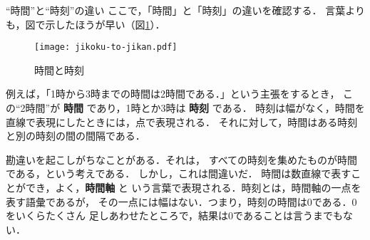             \begin{memo}{“時間”と“時刻”の違い}
                ここで，「時間」と「時刻」の違いを確認する．
                言葉よりも，図で示したほうが早い（図\ref{fig:jikoku-to-jikan}）．
                \begin{figure}[hbt]
                    \begin{center}
                        \texttt{[image: jikoku-to-jikan.pdf]}
                        \caption{時間と時刻}
                        \label{fig:jikoku-to-jikan}
                    \end{center}
                \end{figure}

                例えば，「1時から3時までの時間は2時間である．」という主張をするとき，
                この“2時間”が \textbf{時間} であり，1時とか3時は \textbf{時刻} である．
                時刻は幅がなく，時間を直線で表現にしたときには，点で表現される．
                それに対して，時間はある時刻と別の時刻の間の間隔である．

                勘違いを起こしがちなことがある．それは，
                すべての時刻を集めたものが時間である，という考えである．
                しかし，これは間違いだ．
                時間は数直線で表すことができ，よく，\textbf{時間軸} と
                いう言葉で表現される．時刻とは，時間軸の一点を表す語彙であるが，
                その一点には幅はない．つまり，時刻の時間は0である．0をいくらたくさん
                足しあわせたところで，結果は0であることは言うまでもない．
            \end{memo}

